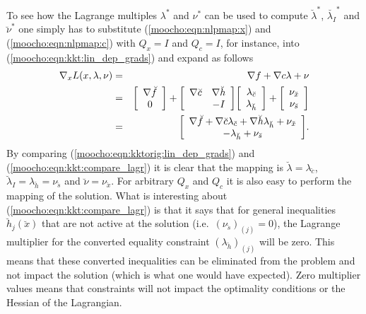 \documentclass[pdf,ps2pdf,11pt]{SANDreport}
\begin{document}
To see how the Lagrange multiples $\lambda^*$ and $\nu^*$ can be used to
compute $\breve{\lambda}^*$, $\breve{\lambda_I}^*$ and $\breve{\nu}^*$ one
simply has to substitute (\ref{moocho:eqn:nlpmap:x}) and
(\ref{moocho:eqn:nlpmap:c}) with $Q_x = I$ and $Q_c = I$, for instance, into
(\ref{moocho:eqn:kkt:lin_dep_grads}) and expand as follows
%
\begin{eqnarray}
\nabla_{x} L(x,\lambda,\nu)
 & = & \nabla f + \nabla c \lambda + \nu \nonumber \\
 & = & {\bmat{c} \nabla \breve{f} \\ 0 \emat}
     + {\bmat{cc} \nabla \breve{c} & \nabla \breve{h} \\ & -I \emat}
       {\bmat{c} \lambda_{\breve{c}} \\ \lambda_{\breve{h}} \emat}
     + {\bmat{c} \nu_{\breve{x}} \\ \nu_{\breve{s}} \emat}
	\nonumber \\
 & = & {\bmat{c}
	\nabla \breve{f} + \nabla \breve{c} \lambda_{\breve{c}} + \nabla \breve{h} \lambda_{\breve{h}} + \nu_{\breve{x}} \\
	-\lambda_{\breve{h}} + \nu_{\breve{s}}
	\emat}.
	\label{moocho:eqn:kkt:compare_lagr}
\end{eqnarray}
%
By comparing (\ref{moocho:eqn:kktorig:lin_dep_grads}) and
(\ref{moocho:eqn:kkt:compare_lagr}) it is clear that the mapping is
$\breve{\lambda} = \lambda_{\breve{c}}$, $\breve{\lambda}_I =
\lambda_{\breve{h}} = \nu_{\breve{s}}$ and $\breve{\nu} = \nu_{\breve{x}}$.
For arbitrary $Q_x$ and $Q_c$ it is also easy to perform the mapping of the
solution.  What is interesting about (\ref{moocho:eqn:kkt:compare_lagr}) is
that it says that for general inequalities $\breve{h}_j(\breve{x})$ that are
not active at the solution (i.e.\ $(\nu_{\breve{s}})_{(j)} = 0$), the Lagrange
multiplier for the converted equality constraint $(\lambda_{\breve{h}})_{(j)}$
will be zero.  This means that these converted inequalities can be eliminated
from the problem and not impact the solution (which is what one would have
expected).  Zero multiplier values means that constraints will not impact the
optimality conditions or the Hessian of the Lagrangian.
\end{document}
